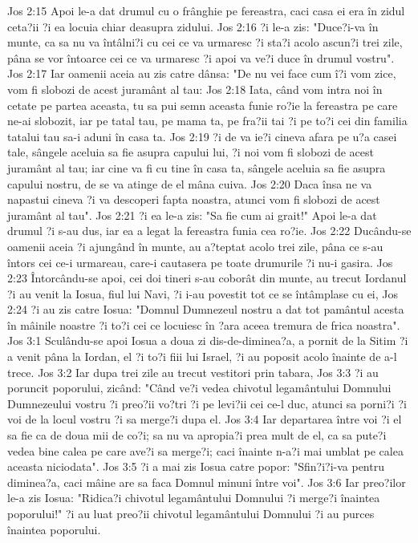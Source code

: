 Jos 2:15  Apoi le-a dat drumul cu o frânghie pe fereastra, caci casa ei era în zidul ceta?ii ?i ea locuia chiar deasupra zidului.
Jos 2:16  ?i le-a zis: "Duce?i-va în munte, ca sa nu va întâlni?i cu cei ce va urmaresc ?i sta?i acolo ascun?i trei zile, pâna se vor întoarce cei ce va urmaresc ?i apoi va ve?i duce în drumul vostru".
Jos 2:17  Iar oamenii aceia au zis catre dânsa: "De nu vei face cum î?i vom zice, vom fi slobozi de acest juramânt al tau:
Jos 2:18  Iata, când vom intra noi în cetate pe partea aceasta, tu sa pui semn aceasta funie ro?ie la fereastra pe care ne-ai slobozit, iar pe tatal tau, pe mama ta, pe fra?ii tai ?i pe to?i cei din familia tatalui tau sa-i aduni în casa ta.
Jos 2:19  ?i de va ie?i cineva afara pe u?a casei tale, sângele aceluia sa fie asupra capului lui, ?i noi vom fi slobozi de acest juramânt al tau; iar cine va fi cu tine în casa ta, sângele aceluia sa fie asupra capului nostru, de se va atinge de el mâna cuiva.
Jos 2:20  Daca însa ne va napastui cineva ?i va descoperi fapta noastra, atunci vom fi slobozi de acest juramânt al tau".
Jos 2:21  ?i ea le-a zis: "Sa fie cum ai grait!" Apoi le-a dat drumul ?i s-au dus, iar ea a legat la fereastra funia cea ro?ie.
Jos 2:22  Ducându-se oamenii aceia ?i ajungând în munte, au a?teptat acolo trei zile, pâna ce s-au întors cei ce-i urmareau, care-i cautasera pe toate drumurile ?i nu-i gasira.
Jos 2:23  Întorcându-se apoi, cei doi tineri s-au coborât din munte, au trecut Iordanul ?i au venit la Iosua, fiul lui Navi, ?i i-au povestit tot ce se întâmplase cu ei,
Jos 2:24  ?i au zis catre Iosua: "Domnul Dumnezeul nostru a dat tot pamântul acesta în mâinile noastre ?i to?i cei ce locuiesc în ?ara aceea tremura de frica noastra".
Jos 3:1  Sculându-se apoi Iosua a doua zi dis-de-diminea?a, a pornit de la Sitim ?i a venit pâna la Iordan, el ?i to?i fiii lui Israel, ?i au poposit acolo înainte de a-l trece.
Jos 3:2  Iar dupa trei zile au trecut vestitori prin tabara,
Jos 3:3  ?i au poruncit poporului, zicând: "Când ve?i vedea chivotul legamântului Domnului Dumnezeului vostru ?i preo?ii vo?tri ?i pe levi?ii cei ce-l duc, atunci sa porni?i ?i voi de la locul vostru ?i sa merge?i dupa el.
Jos 3:4  Iar departarea între voi ?i el sa fie ca de doua mii de co?i; sa nu va apropia?i prea mult de el, ca sa pute?i vedea bine calea pe care ave?i sa merge?i; caci înainte n-a?i mai umblat pe calea aceasta niciodata".
Jos 3:5  ?i a mai zis Iosua catre popor: "Sfin?i?i-va pentru diminea?a, caci mâine are sa faca Domnul minuni între voi".
Jos 3:6  Iar preo?ilor le-a zis Iosua: "Ridica?i chivotul legamântului Domnului ?i merge?i înaintea poporului!" ?i au luat preo?ii chivotul legamântului Domnului ?i au purces înaintea poporului.
